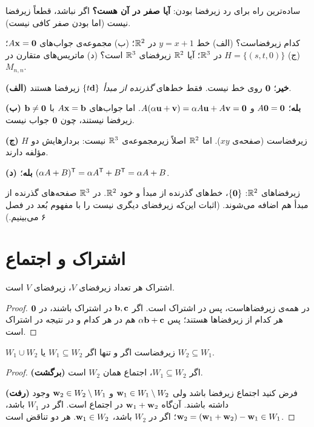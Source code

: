 \begin{warning}
ساده‌ترین راه برای رد زیرفضا بودن: \textbf{آیا صفر در آن هست؟} اگر نباشد، قطعاً زیرفضا نیست (اما بودن صفر کافی نیست).
\end{warning}

\begin{example}
کدام زیرفضاست؟
(الف) خط $y=x+1$ در $\mathbb{R}^2$؛
(ب) مجموعه‌ی جواب‌های $A\mathbf{x}=\mathbf{0}$؛
(ج) $H=\{(s,t,0)\}$ در $\mathbb{R}^3$؛ آیا $\mathbb{R}^2$ زیرفضای $\mathbb{R}^3$ است؟
(د) ماتریس‌های متقارن  در $M_{n,n}$.
\end{example}
\begin{solution}
\textbf{(الف) خیر}؛ $\mathbf{0}$ روی خط نیست. فقط خط‌های \emph{گذرنده از مبدأ} $\{t\mathbf{d}\}$ زیرفضا هستند.

\textbf{(ب) بله}؛ $A\mathbf{0}=\mathbf{0}$ و $A(\alpha\mathbf{u}+\mathbf{v})=\alpha A\mathbf{u}+A\mathbf{v}=\mathbf{0}$. اما جواب‌های $A\mathbf{x}=\mathbf{b}$ با $\mathbf{b}\neq\mathbf{0}$ زیرفضا نیستند، چون $\mathbf{0}$ جواب نیست.

\textbf{(ج)} $H$ زیرفضاست (صفحه‌ی $xy$). اما $\mathbb{R}^2$ اصلاً زیرمجموعه‌ی $\mathbb{R}^3$ نیست: بردارهایش دو مؤلفه دارند.

\textbf{(د) بله}؛ $(\alpha A+B)^{\mathsf{T}}=\alpha A^{\mathsf{T}}+B^{\mathsf{T}}=\alpha A+B$.
\end{solution}

\begin{note}
زیرفضاهای $\mathbb{R}^2$: $\{\mathbf{0}\}$، خط‌های گذرنده از مبدأ و خود $\mathbb{R}^2$. در $\mathbb{R}^3$ صفحه‌های گذرنده از مبدأ هم اضافه می‌شوند. (اثبات این‌که زیرفضای دیگری نیست را با مفهوم بُعد  در فصل ۶ می‌بینیم.)
\end{note}

\section{اشتراک و اجتماع}

\begin{theorem}\label{thm:intersection}
اشتراک هر تعداد زیرفضای $V$، زیرفضای $V$ است.
\end{theorem}
\begin{proof}
$\mathbf{0}$ در همه‌ی زیرفضاهاست، پس در اشتراک است. اگر $\mathbf{b},\mathbf{c}$ در اشتراک باشند، در هر کدام از زیرفضاها هستند؛ پس $\alpha\mathbf{b}+\mathbf{c}$ هم در هر کدام و در نتیجه در اشتراک است.
\end{proof}

\begin{theorem}\label{thm:union}
$W_1\cup W_2$ زیرفضاست اگر و تنها اگر $W_1\subseteq W_2$ یا $W_2\subseteq W_1$.
\end{theorem}
\begin{proof}
\textbf{(برگشت)} اگر $W_1\subseteq W_2$، اجتماع همان $W_2$ است.

\textbf{(رفت)} فرض کنید اجتماع زیرفضا باشد ولی $\mathbf{w}_1\in W_1\setminus W_2$ و $\mathbf{w}_2\in W_2\setminus W_1$ وجود داشته باشند. آن‌گاه $\mathbf{w}_1+\mathbf{w}_2$ در اجتماع است. اگر در $W_1$ باشد، $\mathbf{w}_2=(\mathbf{w}_1+\mathbf{w}_2)-\mathbf{w}_1\in W_1$؛ اگر در $W_2$ باشد، $\mathbf{w}_1\in W_2$. هر دو تناقض است.
\end{proof}

